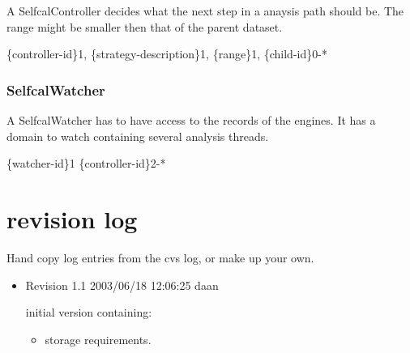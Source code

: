 \documentclass[]{lofar}
\begin{document}
      A SelfcalController decides what the next step in a anaysis path
      should be. The range might be smaller then that of the parent
      dataset.

     



      \{controller-id\}1, \{strategy-description\}1, \{range\}1, \{child-id\}0-*

     

\subsubsection{SelfcalWatcher}
\label{id2721718}\hypertarget{id2721718}{}%



      A SelfcalWatcher has to have access to the records of the
      engines. It has a domain to watch containing several analysis
      threads.

     



      \{watcher-id\}1 \{controller-id\}2-*

     


\newcommand{\dbappendix}[1]{\section{#1}}%
\appendix

\dbappendix{revision log}
\label{id2721729}\hypertarget{id2721729}{}%



   Hand copy log entries from the cvs log, or make up your own.

  

\begin{itemize}

	\item 

      Revision 1.1 2003/06/18 12:06:25 daan
     


      initial version containing:
      \begin{itemize}

	\item 

         storage requirements.
        

\end{itemize}


\end{itemize}
\end{document}
